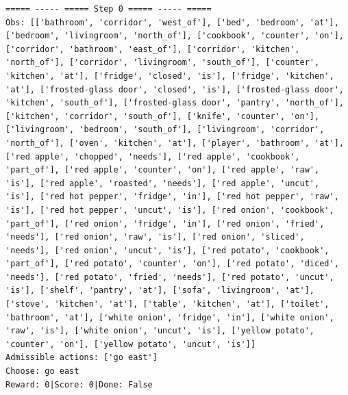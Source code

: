 \documentclass[11pt]{article}
\begin{document}
\begin{lstlisting}
===== ----- ===== Step 0 ===== ----- =====
Obs: [['bathroom', 'corridor', 'west_of'], ['bed', 'bedroom', 'at'], ['bedroom', 'livingroom', 'north_of'], ['cookbook', 'counter', 'on'], ['corridor', 'bathroom', 'east_of'], ['corridor', 'kitchen', 'north_of'], ['corridor', 'livingroom', 'south_of'], ['counter', 'kitchen', 'at'], ['fridge', 'closed', 'is'], ['fridge', 'kitchen', 'at'], ['frosted-glass door', 'closed', 'is'], ['frosted-glass door', 'kitchen', 'south_of'], ['frosted-glass door', 'pantry', 'north_of'], ['kitchen', 'corridor', 'south_of'], ['knife', 'counter', 'on'], ['livingroom', 'bedroom', 'south_of'], ['livingroom', 'corridor', 'north_of'], ['oven', 'kitchen', 'at'], ['player', 'bathroom', 'at'], ['red apple', 'chopped', 'needs'], ['red apple', 'cookbook', 'part_of'], ['red apple', 'counter', 'on'], ['red apple', 'raw', 'is'], ['red apple', 'roasted', 'needs'], ['red apple', 'uncut', 'is'], ['red hot pepper', 'fridge', 'in'], ['red hot pepper', 'raw', 'is'], ['red hot pepper', 'uncut', 'is'], ['red onion', 'cookbook', 'part_of'], ['red onion', 'fridge', 'in'], ['red onion', 'fried', 'needs'], ['red onion', 'raw', 'is'], ['red onion', 'sliced', 'needs'], ['red onion', 'uncut', 'is'], ['red potato', 'cookbook', 'part_of'], ['red potato', 'counter', 'on'], ['red potato', 'diced', 'needs'], ['red potato', 'fried', 'needs'], ['red potato', 'uncut', 'is'], ['shelf', 'pantry', 'at'], ['sofa', 'livingroom', 'at'], ['stove', 'kitchen', 'at'], ['table', 'kitchen', 'at'], ['toilet', 'bathroom', 'at'], ['white onion', 'fridge', 'in'], ['white onion', 'raw', 'is'], ['white onion', 'uncut', 'is'], ['yellow potato', 'counter', 'on'], ['yellow potato', 'uncut', 'is']]
Admissible actions: ['go east']
Choose: go east
Reward: 0|Score: 0|Done: False


\end{lstlisting}
\end{document}
